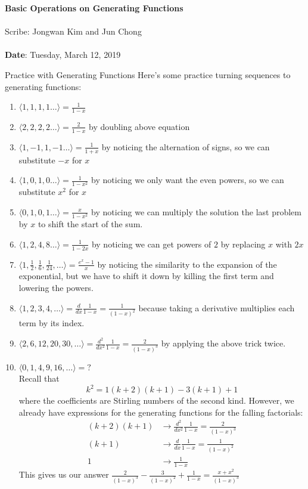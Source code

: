 \documentclass[11pt,twosided]{article}
\def\titlestring{Basic Operations on Generating Functions}
\def\scribestring{Jongwan Kim and Jun Chong}
\def\datestring{Tuesday, March 12, 2019}
\begin{document}
\thispagestyle{plain}  %

\noindent
{\LARGE \textbf{\titlestring}}\\\\
%
{\Large Scribe: \scribestring}\\ \\
{\textbf{Date}: \datestring}

\begin{section}{Practice with Generating Functions}
Here's some practice turning sequences to generating functions:
\begin{enumerate}[a]
\item $\langle 1, 1, 1, 1 \ldots \rangle = \frac{1}{1-x}$
\item $\langle 2, 2, 2, 2 \ldots \rangle = \frac{2}{1-x}$ by doubling above equation
\item $\langle 1, -1, 1, -1 \ldots \rangle = \frac{1}{1+x}$ by noticing the alternation of signs, so we can substitute $-x$ for $x$
\item $\langle 1, 0, 1, 0 \ldots \rangle = \frac{1}{1-x^2}$ by noticing we only want the even powers, so we can substitute $x^2$ for $x$
\item $\langle 0, 1, 0, 1 \ldots \rangle = \frac{x}{1-x^2}$ by noticing we can multiply the solution the last problem by $x$ to shift the start of the sum.
\item $\langle 1, 2, 4, 8 \ldots \rangle = \frac{1}{1-2x}$ by noticing we can get powers of $2$ by replacing $x$ with $2x$
\item $\langle 1, \frac12, \frac16, \frac{1}{24}, \ldots \rangle = \frac{e^x - 1}{x}$ by noticing the similarity to the expansion of the exponential, but we have to shift it down by killing the first term and lowering the powers.
\item $\langle 1, 2, 3, 4, \ldots \rangle = \frac{d}{dx}\frac{1}{1-x} = \frac{1}{(1-x)^2}$ because taking a derivative multiplies each term by its index.
\item $\langle 2, 6, 12, 20, 30, \ldots \rangle = \frac{d^2}{dx^2}\frac{1}{1-x} = \frac{2}{(1-x)^3}$ by applying the above trick twice.
\item $\langle 0, 1, 4, 9, 16, \ldots \rangle = ?$ \\
Recall that 
$$k^2 = 1(k+2)(k+1) - 3(k+1) + 1$$ where the coefficients are Stirling numbers of the second kind. However, we already have expressions for the generating functions for the falling factorials: 
\begin{align*}
    (k+2)(k+1) &\rightarrow \frac{d^2}{dx^2}\frac{1}{1-x} = \frac{2}{(1-x)^3} \\
    (k+1) &\rightarrow \frac{d}{dx}\frac{1}{1-x} = \frac{1}{(1-x)^2} \\
    1 &\rightarrow \frac{1}{1-x}
\end{align*}
This gives us our answer $\frac{2}{(1-x)^3} - \frac{3}{(1-x)^2} + \frac{1}{1-x} = \frac{x + x^2}{(1-x)^3}$
\end{enumerate}
\end{section}
\end{document}
